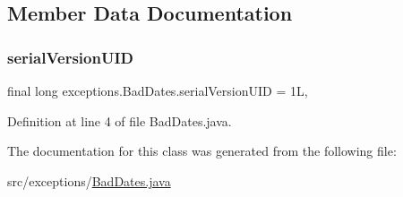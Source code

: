 \subsection{Member Data Documentation}
\mbox{\label{classexceptions_1_1BadDates_a1703e41273cdde53ece45e307839c449}} 
\subsubsection{\texorpdfstring{serialVersionUID}{serialVersionUID}}
{\footnotesize\ttfamily final long exceptions.\+Bad\+Dates.\+serial\+Version\+U\+ID = 1L\hspace{0.3cm}{\ttfamily [static]}, {\ttfamily [private]}}



Definition at line 4 of file Bad\+Dates.\+java.



The documentation for this class was generated from the following file\+:\begin{DoxyCompactItemize}
\item 
src/exceptions/\mbox{\hyperlink{BadDates_8java}{Bad\+Dates.\+java}}\end{DoxyCompactItemize}
